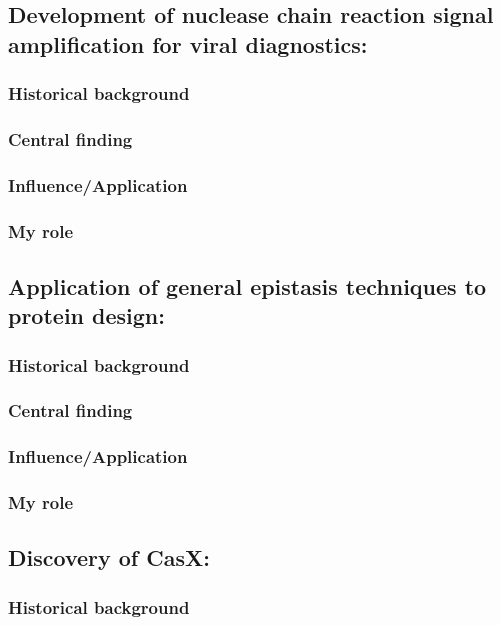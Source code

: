\documentclass{article}
\begin{document}
\newrefsection
\subsection{Development of nuclease chain reaction signal amplification for viral diagnostics:}
\subsubsection{Historical background}
%
\subsubsection{Central finding}
%
\subsubsection{Influence/Application}
%
\subsubsection{My role}
%
\nocite{Liu2021-pu}
\printbibliography[heading=none]

\subsection{Application of general epistasis techniques to protein design:}
\subsubsection{Historical background}
%
\subsubsection{Central finding}
%
\subsubsection{Influence/Application}
%
\subsubsection{My role}
%

\newrefsection
\subsection{Discovery of CasX:}
\subsubsection{Historical background}
%
\end{document}
